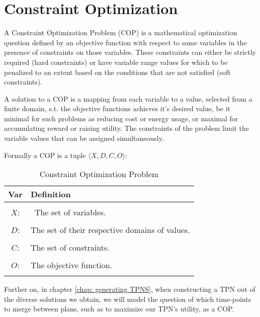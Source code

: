 \section{Constraint Optimization}
\label{background: COP}
A Constraint Optimization Problem (COP) is a mathematical optimization question defined by an objective function with respect to some variables in the presence of constraints on those variables. 
These constraints can either be strictly required (hard constraints) or have variable range values for which to be penalized to an extent based on the conditions that are not satisfied (soft constraints).

A solution to a COP is a mapping from each variable to a value, selected from a finite domain, s.t. the objective functions achieves it's desired value, be it minimal for such problems as reducing cost or energy usage, or maximal for accumulating reward or raising utility.
The constraints of the problem limit the variable values that can be assigned simultaneously.

Formally a COP is a tuple $\langle X,D,C,O\rangle$: 
\begin{table}[ht!]
\centering
\begin{tabularx}{\textwidth}{ c  X }

\textbf{Var}  & \textbf{Definition} \\
\hline
\\
$X$:     & \ {The set of variables.}  \\
\\
$D$:     & {The set of their respective domains of values. }       \\
\\
$C$:     & {The set of constraints.}      \\
\\
$O$:     & {The objective function.}      \\
\\

\end{tabularx}
\caption{Constraint Optimization Problem}
\label{tab:COP}
\end{table}


Further on, in chapter \ref{chap: generating TPNS},  when constructing a TPN out of the diverse solutions we obtain, we will model the question of which time-points to merge between plans, such as to maximize our TPN's utility, as a COP.

